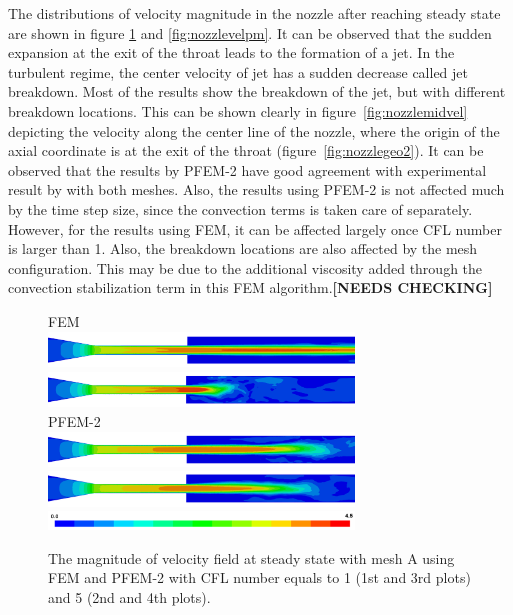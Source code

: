 The distributions of velocity magnitude in the nozzle after reaching steady state are shown in figure \ref{fig:nozzlevelfm} and \ref{fig:nozzlevelpm}. It can be observed that the sudden expansion at the exit of the throat leads to the formation of a jet. In the turbulent regime, the center velocity of jet has a sudden decrease called jet breakdown. Most of the results show the breakdown of the jet, but with different breakdown locations. This can be shown clearly in figure~\ref{fig:nozzlemidvel} depicting the velocity along the center line of the nozzle, where the origin of the axial coordinate is at the exit of the throat (figure~\ref{fig:nozzlegeo2}). It can be observed that the results by PFEM-2 have good agreement with experimental result by \cite{hariharan_nozzle} with both meshes. Also, the results using PFEM-2 is not affected much by the time step size, since the convection terms is taken care of separately. However, for the results using FEM, it can be affected largely once CFL number is larger than 1. Also, the breakdown locations are also affected by the mesh configuration. This may be due to the additional viscosity added through the convection stabilization term in this FEM algorithm.\textbf{[NEEDS CHECKING]}

\begin{figure}[htbp]
    \centering
    FEM\\
    \includegraphics[width=3.2in]{imgs/nozzle_pump/nozzle_fem_fm_cfl1.png}
    \includegraphics[width=3.2in]{imgs/nozzle_pump/nozzle_fem_fm_cfl5.png}\\
    PFEM-2\\
    \includegraphics[width=3.2in]{imgs/nozzle_pump/nozzle_pfem_fm_cfl1.png}
    \includegraphics[width=3.2in]{imgs/nozzle_pump/nozzle_pfem_fm_cfl5.png}
    \includegraphics[width=3.2in]{imgs/nozzle_pump/nozzle_legend.png}
    \caption{The magnitude of velocity field at steady state with mesh A using FEM and PFEM-2 with CFL number equals to 1 (1st and 3rd plots) and 5 (2nd and 4th plots). }
    \label{fig:nozzlevelfm}
\end{figure}

